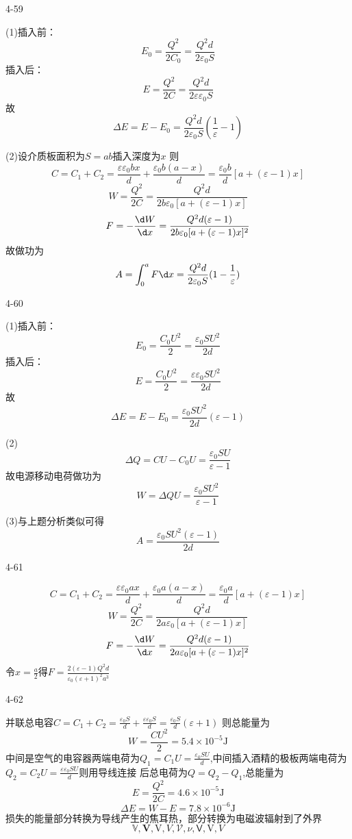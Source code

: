\documentclass{phyasgn}
\begin{document}
{\heiti\color{red} 4-59}
\begin{sol}
    (1)插入前：
    $$E_0=\frac{Q^2}{2C_0}=\frac{Q^2d}{2\varepsilon_0S}$$
    插入后：
    $$E=\frac{Q^2}{2C}=\frac{Q^2d}{2\varepsilon\varepsilon_0S}$$
    故$$\Delta E=E-E_0=\frac{Q^2d}{2\varepsilon_0S}(\frac{1}{\varepsilon}-1)$$\par
    (2)设介质板面积为$S=ab$插入深度为$x$
    则$$C=C_1+C_2=\frac{\varepsilon\varepsilon_0 bx}{d}+\frac{\varepsilon_0b(a-x)}{d}=\frac{\varepsilon_0 b}{d} [a+(\varepsilon-1)x ]$$
    $$W=\frac{Q^2}{2C}=\frac{Q^2d}{2b\varepsilon_0[a+(\varepsilon-1)x ]}$$
    $$F=-\frac{\d W}{\d x}=\frac{Q^2d(\varepsilon-1)}{2b\varepsilon_0[a+(\varepsilon-1)x ]^2}$$
    故做功为
    $$A=\int_0^aF\d x=\frac{Q^2d}{2\varepsilon_0S}(1-\frac{1}{\varepsilon})$$
\end{sol}\par


{\heiti\color{red} 4-60}
\begin{sol}
    (1)插入前：
    $$E_0=\frac{C_0U^2}{2}=\frac{\varepsilon_0SU^2}{2d}$$
    插入后：
    $$E=\frac{C_0U^2}{2}=\frac{\varepsilon\varepsilon_0SU^2}{2d}$$
    故$$\Delta E=E-E_0=\frac{\varepsilon_0SU^2}{2d}(\varepsilon-1)$$\par
    (2)$$\Delta Q=CU-C_0U=\frac{\varepsilon_0SU}{\varepsilon-1}$$
    故电源移动电荷做功为
    $$W=\Delta Q U=\frac{\varepsilon_0SU^2}{\varepsilon-1}$$\par
    (3)与上题分析类似可得$$A=\frac{\varepsilon_0SU^2(\varepsilon-1)}{2d}$$
\end{sol}\par

{\heiti\color{red} 4-61}
\begin{sol}
    $$C=C_1+C_2=\frac{\varepsilon\varepsilon_0 ax}{d}+\frac{\varepsilon_0a(a-x)}{d}=\frac{\varepsilon_0 a}{d} [a+(\varepsilon-1)x ]$$
    $$W=\frac{Q^2}{2C}=\frac{Q^2d}{2a\varepsilon_0[a+(\varepsilon-1)x ]}$$
    $$F=-\frac{\d W}{\d x}=\frac{Q^2d(\varepsilon-1)}{2a\varepsilon_0[a+(\varepsilon-1)x ]^2}$$
    令$x=\frac{a}{2}$得$F=\frac{2(\varepsilon-1)Q^2d}{\varepsilon_0(\varepsilon+1)^2a^3}$
\end{sol}\par

{\heiti\color{red} 4-62}
\begin{sol}
    并联总电容$C=C_1+C_2=\frac{\varepsilon_0 S}{d}+\frac{\varepsilon \varepsilon_0S}{d}=\frac{\varepsilon_0S}{d}(\varepsilon+1)$
    则总能量为
    $$W=\frac{CU^2}{2}=5.4\times 10^{-5}\mathrm{J}$$
    中间是空气的电容器两端电荷为$Q_1=C_1U=\frac{\varepsilon_0SU}{d}$,中间插入酒精的极板两端电荷为$Q_2=C_2U=\frac{\varepsilon\varepsilon_0SU}{d}$则用导线连接
    后总电荷为$Q=Q_2-Q_1$,总能量为 
    $$E=\frac{Q^2}{2C}=4.6\times 10^{-5}\mathrm{J}$$
    $$\Delta E=W-E=7.8\times 10^{-6}\mathrm{J}$$
    损失的能量部分转换为导线产生的焦耳热，部分转换为电磁波辐射到了外界
    $$\mathbb{V},\mathbf{V},\mathrm{V},V,\mathcal{V},\nu,\mathsf{V},\text{V},\mathit{V}$$
\end{sol}\par
\end{document}
